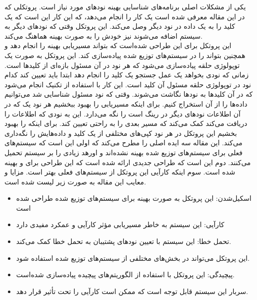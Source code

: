 \documentclass[a4paper, 12pt]{article}
\title{\lr{Chord: A Scalable Peer-to-peer Lookup Service for Internet
Applications}}
\author{حسین افکار}
\begin{document}
\maketitle
یکی از مشکلات اصلی برنامه‌های
شناسایی بهینه نود‌های مورد نیاز است.
پروتکلی که در این مقاله معرفی شده است یک کار را انجام می‌دهد،
که این کار این است که یک کلید را به یک داده در نود دیگر وصل می‌کند.
این پروتکل وقتی که نود‌های دیگر به سیستم اضافه می‌شوند نیز خودش را به صورت بهینه هماهنگ می‌کند. \\
این پروتکل برای این طراحی شده‌است که بتواند مسیر‌یابی بهینه را انجام دهد و همچنین بتواند
را در سیستم‌های توزیع شده پیاده‌سازی کند.
این پروتکل به صورت یک توپولوژی حلقه پیاده‌سازی می‌شود که هر نود در آن مسئول بازه‌ای
از کلید‌ها است.
زمانی که نودی بخواهد یک عمل جستجو یک کلید را انجام دهد ابتدا باید تعیین کند
کدام نود در توپولوژی حلقه مسئول آن کلید است.
این کار با استفاده از تکنیک
انجام می‌شود که در آن کلید‌ها به نود‌ها نگاشت می‌شوند.
وقتی که نود مسئول شناسایی شد می‌توانیم داده‌ها را از آن استخراج کنیم.
برای اینکه مسیر‌یابی را بهبود ببخشیم هر نود یک
که در آن اطلاعات نود‌های دیگر در رینگ است را نگه می‌دارد.
این به نودی که اطلاعات را دریافت می‌کند کمک می‌کند که مسیر بعدی را به راحتی تعیین کند.
برای اینکه
را بهبود بخشیم این پروتکل در هر نود کپی‌های مختلفی از یک کلید و داده‌هایش را نگه‌داری می‌کند.
این مقاله سه ایده اصلی را مطرح می‌کند که اولی این است که سیستم‌های
فعلی برای سیستم‌های توزیع شده بهینه نشده‌اند و اور‌هد زیادی را بر سیستم تحمیل می‌کنند.
دوم این است که طراحی جدیدی ارائه شده است که این طراحی برای
و
بهینه شده است.
سوم اینکه کارآیی این پروتکل از سیستم‌های فعلی بهتر است.
مزایا و معایب این مقاله به صورت زیر لیست شده است.
\begin{itemize}
    \item اسکیل‌شدن: این پروتکل به صورت بهینه برای سیستم‌های توزیع شده طراحی شده است
    \item کارآیی: این سیستم به خاطر مسیر‌یابی مؤثر کارآیی و عمکرد مفیدی دارد
    \item تحمل خطا: این سیستم با تعیین نود‌های پشتیبان به تحمل خطا کمک می‌کند.
    \item این پروتکل می‌تواند در بخش‌های مختلفی از سیستم‌های توزیع شده استفاده شود.
    \item پیچیدگی: این پروتکل با استفاده از الگوریتم‌های پیچیده پیاده‌سازی شده‌است.
    \item سربار این سیستم قابل توجه است که ممکن است کارآیی را تحت تأثیر قرار دهد.
\end{itemize}
\end{document}
